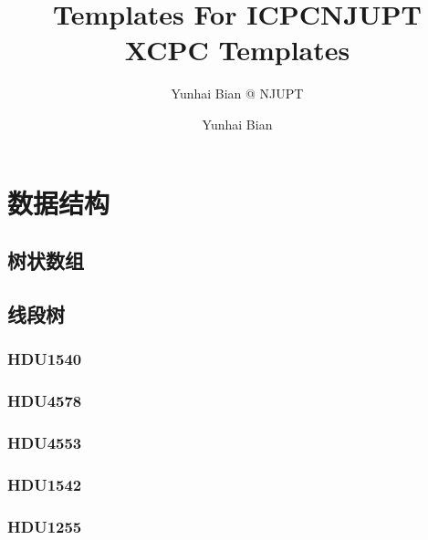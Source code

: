 \documentclass[12pt,a4paper]{article}
\title{Templates For ICPC}
\author{Yunhai Bian @ NJUPT}
\begin{document}
\title{NJUPT XCPC Templates}
\author {Yunhai Bian}
\maketitle
\tableofcontents
\newpage
\section{数据结构}
\subsection{树状数组}

\subsection{线段树}
\subsubsection{HDU1540}
\begin{spacing}{1.5}

\end{spacing}

\subsubsection{HDU4578}
\begin{spacing}{1.5}

\end{spacing}

\subsubsection{HDU4553}
\begin{spacing}{1.5}

\end{spacing}

\subsubsection{HDU1542}
\begin{spacing}{1.5}

\end{spacing}

\subsubsection{HDU1255}
\begin{spacing}{1.5}

\end{spacing}

\end{document}
